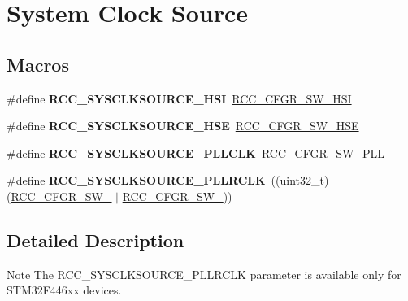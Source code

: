 \hypertarget{group___r_c_c___system___clock___source}{}\section{System Clock Source}
\label{group___r_c_c___system___clock___source}
\subsection*{Macros}
\begin{DoxyCompactItemize}
\item 
\mbox{\label{group___r_c_c___system___clock___source_gaaeeb699502e7d7a9f1b5d57fcf1f5095}} 
\#define {\bfseries R\+C\+C\+\_\+\+S\+Y\+S\+C\+L\+K\+S\+O\+U\+R\+C\+E\+\_\+\+H\+SI}~\hyperlink{group___peripheral___registers___bits___definition_gacbac8bae4f0808b3c3a5185aa10081fb}{R\+C\+C\+\_\+\+C\+F\+G\+R\+\_\+\+S\+W\+\_\+\+H\+SI}
\item 
\mbox{\label{group___r_c_c___system___clock___source_ga9116d0627e1e7f33c48e1357b9a35a1c}} 
\#define {\bfseries R\+C\+C\+\_\+\+S\+Y\+S\+C\+L\+K\+S\+O\+U\+R\+C\+E\+\_\+\+H\+SE}~\hyperlink{group___peripheral___registers___bits___definition_gafb563f217242d969f4355d0818fde705}{R\+C\+C\+\_\+\+C\+F\+G\+R\+\_\+\+S\+W\+\_\+\+H\+SE}
\item 
\mbox{\label{group___r_c_c___system___clock___source_ga5caf08ac71d7dd7e7b2e3e421606aca7}} 
\#define {\bfseries R\+C\+C\+\_\+\+S\+Y\+S\+C\+L\+K\+S\+O\+U\+R\+C\+E\+\_\+\+P\+L\+L\+C\+LK}~\hyperlink{group___peripheral___registers___bits___definition_ga87389cacb2eaf53730da13a2a33cd487}{R\+C\+C\+\_\+\+C\+F\+G\+R\+\_\+\+S\+W\+\_\+\+P\+LL}
\item 
\mbox{\label{group___r_c_c___system___clock___source_ga1fa5dbd16ee193b62cfc42418a62f48d}} 
\#define {\bfseries R\+C\+C\+\_\+\+S\+Y\+S\+C\+L\+K\+S\+O\+U\+R\+C\+E\+\_\+\+P\+L\+L\+R\+C\+LK}~((uint32\+\_\+t)(\hyperlink{group___peripheral___registers___bits___definition_ga99f08d86fd41824058a7fdf817f7e2fd}{R\+C\+C\+\_\+\+C\+F\+G\+R\+\_\+\+S\+W\+\_} $\vert$ \hyperlink{group___peripheral___registers___bits___definition_ga72d51cb5d66ee1aa4d2c6f14796a072f}{R\+C\+C\+\_\+\+C\+F\+G\+R\+\_\+\+S\+W\+\_}))
\end{DoxyCompactItemize}


\subsection{Detailed Description}
\begin{DoxyNote}{Note}
The R\+C\+C\+\_\+\+S\+Y\+S\+C\+L\+K\+S\+O\+U\+R\+C\+E\+\_\+\+P\+L\+L\+R\+C\+LK parameter is available only for S\+T\+M32\+F446xx devices. 
\end{DoxyNote}
